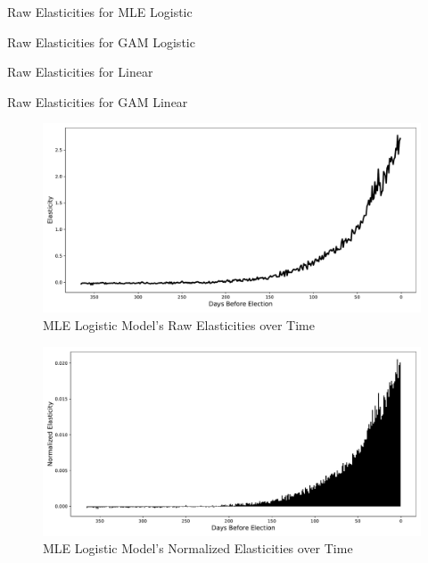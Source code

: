 \begin{table}[H]
	\centering
	\begin{minipage}{0.48\textwidth}
		\centering
		
		\caption{Raw Elasticities for MLE Logistic}
		\label{tab:log-elast}
	\end{minipage}\hfill
	\begin{minipage}{0.48\textwidth}
		\centering
		
		\caption{Raw Elasticities for GAM Logistic}
		\label{tab:log-gam-elast}
	\end{minipage}
\end{table}

\begin{table}[H]
	\centering
	\begin{minipage}{0.48\textwidth}
		\centering
		
		\caption{Raw Elasticities for Linear}
		\label{tab:lin-elast}
	\end{minipage}\hfill
	\begin{minipage}{0.48\textwidth}
		\centering
		
		\caption{Raw Elasticities for GAM Linear}
		\label{tab:lin-gam-elast}
	\end{minipage}
\end{table}

\begin{figure}[H]
	\centering
	\includegraphics[width=0.8\linewidth]{../Figures/elasticity_over_time.pdf}
	\caption{MLE Logistic Model's Raw Elasticities over Time}
	\label{fig:log-e-time}
\end{figure}

\begin{figure}[H]
	\centering
	\includegraphics[width=0.8\linewidth]{../Figures/norm_elast_over_time.pdf}
	\caption{MLE Logistic Model's Normalized Elasticities over Time}
	\label{fig:log-norm-e-time}
\end{figure}

